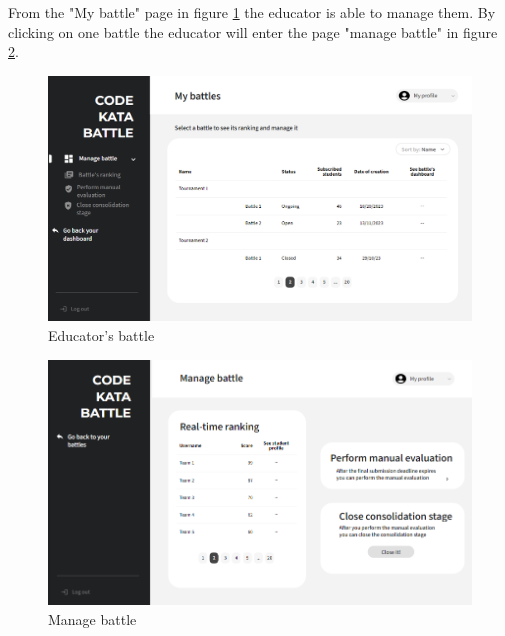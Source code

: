 From the "My battle" page in figure \ref{fig:EmyB} the educator is able to manage them. By clicking on one battle the educator will enter the page "manage battle" in figure \ref{fig:manageB}.
\begin{figure}[h]
    \centering
    \includegraphics[width=\textwidth]{images/mockups/educators/MyBattles.png}
    \caption{Educator's battle}
    \label{fig:EmyB}
\end{figure}

\begin{figure}[h]
    \centering
    \includegraphics[width=\textwidth]{images/mockups/educators/ManageBattle.png}
    \caption{Manage battle}
    \label{fig:manageB}
\end{figure}

